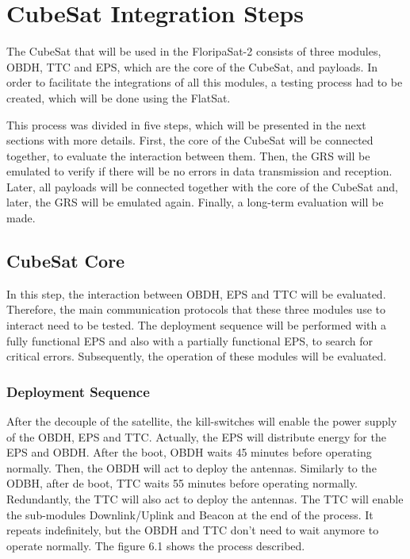 \chapter{CubeSat Integration Steps} \label{ch:cubesat-integration-steps}

The CubeSat that will be used in the FloripaSat-2 consists of three modules, OBDH, TTC and EPS, which are the core of the CubeSat, and payloads. In order to facilitate the integrations of all this modules, a testing process had to be created, which will be done using the FlatSat.

This process was divided in five steps, which will be presented in the next sections with more details. First, the core of the CubeSat will be connected together, to evaluate the interaction between them. Then, the GRS will be emulated to verify if there will be no errors in data transmission and reception. Later, all payloads will be connected together with the core of the CubeSat and, later, the GRS will be emulated again. Finally, a long-term evaluation will be made.

\section{CubeSat Core}

In this step, the interaction between OBDH, EPS and TTC will be evaluated. Therefore, the main communication protocols that these three modules use to interact need to be tested. The deployment sequence will be performed with a fully functional EPS and also with a partially functional EPS, to search for critical errors. Subsequently, the operation of these modules will be evaluated.

\subsection{Deployment Sequence}

After the decouple of the satellite, the kill-switches will enable the power supply of the OBDH, EPS and TTC. Actually, the EPS will distribute energy for the EPS and OBDH. After the boot, OBDH waits 45 minutes before operating normally. Then, the OBDH will act to deploy the antennas. Similarly to the ODBH, after de boot, TTC waits 55 minutes before operating normally. Redundantly, the TTC will also act to deploy the antennas. The TTC will enable the sub-modules Downlink/Uplink and Beacon at the end of the process. It repeats indefinitely, but the OBDH and TTC don’t need to wait anymore to operate normally. The figure 6.1 shows the process described.


